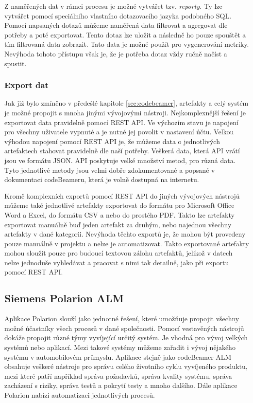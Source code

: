 \documentclass[czech,master,public,dept460,male,cpdeclaration,oneside]{diploma}
\begin{document}
Z naměřených dat v rámci procesu je možné vytvářet tzv. \textit{reporty}. Ty lze vytvářet pomocí speciálního vlastního dotazovacího jazyka podobného SQL. Pomocí napsaných dotazů můžeme naměřená data filtrovat a agregovat dle potřeby a poté exportovat. Tento dotaz lze uložit a následně ho pouze spouštět a tím filtrovaná data zobrazit. Tato data je možné použít pro vygenerování metriky. Nevýhoda tohoto přístupu však je, že je potřeba dotaz vždy ručně načíst a spustit.

\subsubsection{Export dat}
Jak již bylo zmíněno v předešlé kapitole \ref{sec:codebeamer}, artefakty a celý systém je možné propojit s mnoha jinými vývojovými nástroji. Nejkomplexnější řešení je exportovat data pravidelně pomocí REST API. Ve výchozím stavu je napojení pro všechny uživatele vypnuté a je nutné jej povolit v nastavení účtu. Velkou výhodou napojení pomocí REST API je, že můžeme data o jednotlivých artefaktech stahovat pravidelně dle naší potřeby. Veškerá data, která API vrátí jsou ve formátu JSON. API poskytuje velké množství metod, pro různá data. Tyto jednotlivé metody jsou velmi dobře zdokumentované a popsané v dokumentaci codeBeameru, která je volně dostupná na internetu.  \cite{ref:codebeamer_rest}

Kromě komplexních exportů pomocí REST API do jiných vývojových nástrojů můžeme také jednotlivé artefakty exportovat do formátu pro Microsoft Office Word a Excel, do formátu CSV a nebo do prostého PDF. Takto lze artefakty exportovat manuálně buď jeden artefakt za druhým, nebo najednou všechny artefakty v dané kategorii. Nevýhoda těchto exportů je, že mohou být provedeny pouze manuálně v projektu a nelze je automatizovat. Takto exportované artefakty mohou sloužit pouze pro budoucí textovou zálohu artefaktů, jelikož v datech nelze jednoduše vyhledávat a pracovat s nimi tak detailně, jako při exportu pomocí REST API. 


\subsection{Siemens Polarion ALM}
Aplikace Polarion slouží jako jednotné řešení, které umožňuje propojit všechny možné účastníky všech procesů v dané společnosti. Pomocí vestavěných nástrojů dokáže propojit různé týmy vyvíjející určitý systém. Je vhodná pro vývoj velkých systémů nebo aplikací. Mezi takové systémy můžeme zařadit i vývoj nějakého systému v automobilovém průmyslu. Aplikace stejně jako codeBeamer ALM obsahuje veškeré nástroje pro správu celého životního cyklu vyvíjeného produktu, mezi které patří například správa požadavků, správa kvality systému, správa zacházení s riziky, správa testů a pokrytí testy a mnoho dalšího. Dále aplikace Polarion nabízí automatizaci jednotlivých procesů. \cite{ref:polarion_about}
\end{document}
